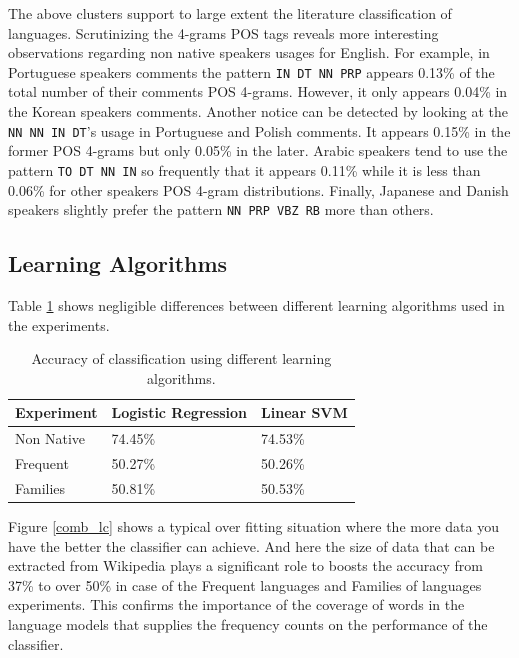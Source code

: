 \documentclass[10pt,a5paper,twoside]{article}
\begin{document}
The above clusters support to large extent the literature classification of
languages. Scrutinizing the 4-grams POS tags reveals more interesting
observations regarding non native speakers usages for English. For example,
in Portuguese speakers comments the pattern \verb+IN DT NN PRP+ appears 0.13\%
of the total number of their comments POS 4-grams. However, it only appears
0.04\% in the Korean speakers comments. Another notice can be detected by
looking at the \verb+NN NN IN DT+'s usage in Portuguese and Polish comments. It
appears 0.15\% in the former POS 4-grams but only 0.05\% in the later. Arabic
speakers tend to use the pattern \verb+TO DT NN IN+ so frequently that it
appears 0.11\% while it is less than 0.06\% for other speakers POS 4-gram
distributions. Finally, Japanese and Danish speakers slightly prefer the pattern
\verb+NN PRP VBZ RB+ more than others.

\subsection{Learning Algorithms}

Table \ref{table:results} shows negligible differences between different learning algorithms used in the experiments. 

\begin{table}
  \begin{center}
  \begin{tabular}{l|ll}
	Experiment & Logistic Regression & Linear SVM
	\\\hline
	Non Native & 74.45\% & 74.53\%\\
	Frequent & 50.27\% & 50.26\%\\
	Families & 50.81\% &50.53\% \\
\end{tabular}
\caption{Accuracy of classification using different learning algorithms.}
\label{table:results}
\end{center}
\end{table}

Figure \ref{comb_lc} shows a typical over fitting situation where the more data
you have the better the classifier can achieve. And here the size of data that
can be extracted from Wikipedia plays a significant role to boosts the accuracy
from 37\% to over 50\% in case of the Frequent languages and Families of
languages experiments. This confirms the importance of the coverage of words in
the language models that supplies the frequency counts on the performance of the classifier.
\end{document}

